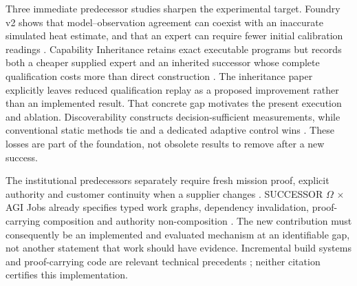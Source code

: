\documentclass[11pt]{article}
\begin{document}
Three immediate predecessor studies sharpen the experimental target. Foundry v2 shows that model--observation agreement can coexist with an inaccurate simulated heat estimate, and that an expert can require fewer initial calibration readings \cite{foundry}. Capability Inheritance retains exact executable programs but records both a cheaper supplied expert and an inherited successor whose complete qualification costs more than direct construction \cite{inheritance}. The inheritance paper explicitly leaves reduced qualification replay as a proposed improvement rather than an implemented result. That concrete gap motivates the present execution and ablation. Discoverability constructs decision-sufficient measurements, while conventional static methods tie and a dedicated adaptive control wins \cite{discoverability}. These losses are part of the foundation, not obsolete results to remove after a new success.

The institutional predecessors separately require fresh mission proof, explicit authority and customer continuity when a supplier changes \cite{neuralsymbolic,gym,seize}. SUCCESSOR $\Omega$ $\times$ AGI Jobs already specifies typed work graphs, dependency invalidation, proof-carrying composition and authority non-composition \cite{successorjobs}. The new contribution must consequently be an implemented and evaluated mechanism at an identifiable gap, not another statement that work should have evidence. Incremental build systems and proof-carrying code are relevant technical precedents \cite{buildsystems,pcc}; neither citation certifies this implementation.
\end{document}
